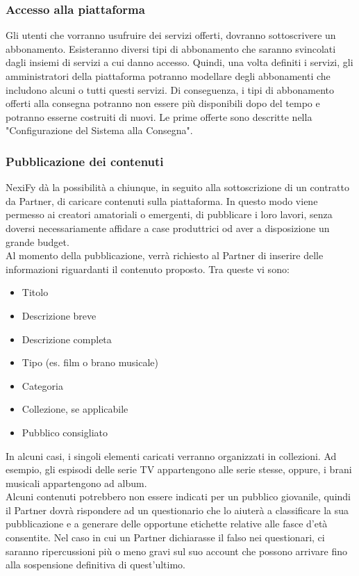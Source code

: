 \subsubsection{Accesso alla piattaforma}
Gli utenti che vorranno usufruire dei servizi offerti, dovranno sottoscrivere un abbonamento. Esisteranno diversi
tipi di abbonamento che saranno svincolati dagli insiemi di servizi a cui danno accesso. Quindi, una volta definiti
i servizi, gli amministratori della piattaforma potranno modellare degli abbonamenti che includono alcuni o
tutti questi servizi. Di conseguenza, i tipi di abbonamento offerti alla consegna potranno non essere più
disponibili dopo del tempo e potranno esserne costruiti di nuovi.
Le prime offerte sono descritte nella "Configurazione del Sistema alla Consegna".

\subsubsection{Pubblicazione dei contenuti}
NexiFy dà la possibilità a chiunque, in seguito alla sottoscrizione di un contratto da Partner,
di caricare contenuti sulla piattaforma. In questo modo viene permesso ai creatori amatoriali o emergenti,
di pubblicare i loro lavori, senza doversi necessariamente affidare a case produttrici od aver a disposizione
un grande budget.\\
Al momento della pubblicazione, verrà richiesto al Partner di inserire delle informazioni riguardanti
il contenuto proposto. Tra queste vi sono:
\begin{itemize}
    \item Titolo 
    \item Descrizione breve
    \item Descrizione completa
    \item Tipo (es. film o brano musicale)
    \item Categoria
    \item Collezione, se applicabile
    \item Pubblico consigliato
\end{itemize}
In alcuni casi, i singoli elementi caricati verranno organizzati in collezioni. Ad esempio, gli espisodi delle
serie TV appartengono alle serie stesse, oppure, i brani musicali appartengono ad album.\\
Alcuni contenuti potrebbero non essere indicati per un pubblico giovanile, quindi il Partner dovrà rispondere ad
un questionario che lo aiuterà a classificare la sua pubblicazione e a generare delle opportune etichette
relative alle fasce d'età consentite. Nel caso in cui un Partner dichiarasse il falso nei questionari, ci 
saranno ripercussioni più o meno gravi sul suo account che possono arrivare fino alla sospensione definitiva
di quest'ultimo.
